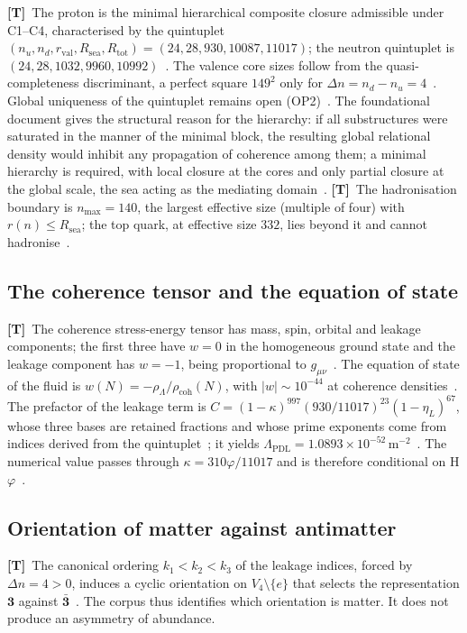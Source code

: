 \documentclass[11pt,a4paper]{article}
\theoremstyle{plain}
\theoremstyle{definition}
\theoremstyle{remark}
\newcommand{\statT}{\textbf{[T]}}
\begin{document}
\statT\ The proton is the minimal hierarchical composite closure admissible under C1--C4, characterised by the quintuplet $(n_u,n_d,r_{\mathrm{val}},R_{\mathrm{sea}},R_{\mathrm{tot}})=(24,28,930,10087,11017)$; the neutron quintuplet is $(24,28,1032,9960,10992)$~\citep{D16a,D47v2,DMv34}. The valence core sizes follow from the quasi-completeness discriminant, a perfect square $149^2$ only for $\Delta n=n_d-n_u=4$~\citep{D47v2}. Global uniqueness of the quintuplet remains open (OP2)~\citep{DMv34}. The foundational document gives the structural reason for the hierarchy: if all substructures were saturated in the manner of the minimal block, the resulting global relational density would inhibit any propagation of coherence among them; a minimal hierarchy is required, with local closure at the cores and only partial closure at the global scale, the sea acting as the mediating domain~\citep{D01}. \statT\ The hadronisation boundary is $n_{\max}=140$, the largest effective size (multiple of four) with $r(n)\le R_{\mathrm{sea}}$; the top quark, at effective size $332$, lies beyond it and cannot hadronise~\citep{D63}.

\subsection{The coherence tensor and the equation of state}

\statT\ The coherence stress-energy tensor has mass, spin, orbital and leakage components; the first three have $w=0$ in the homogeneous ground state and the leakage component has $w=-1$, being proportional to $g_{\mu\nu}$~\citep{D48,D54,D67}. The equation of state of the fluid is $w(N)=-\rho_\Lambda/\rho_{\mathrm{coh}}(N)$, with $|w|\sim10^{-44}$ at coherence densities~\citep{D54}. The prefactor of the leakage term is $C=(1-\kappa)^{997}(930/11017)^{23}(1-\eta_L)^{67}$, whose three bases are retained fractions and whose prime exponents come from indices derived from the quintuplet~\citep{D51,D52}; it yields $\Lambda_{\mathrm{PDL}}=1.0893\times10^{-52}\,\mathrm{m}^{-2}$~\citep{D51,D53}. The numerical value passes through $\kappa=310\varphi/11017$ and is therefore conditional on H$\varphi$~\citep{D05v2,DMv34}.

\subsection{Orientation of matter against antimatter}

\statT\ The canonical ordering $k_1<k_2<k_3$ of the leakage indices, forced by $\Delta n=4>0$, induces a cyclic orientation on $V_4\setminus\{e\}$ that selects the representation $\mathbf{3}$ against $\bar{\mathbf{3}}$~\citep{D59}. The corpus thus identifies which orientation is matter. It does not produce an asymmetry of abundance.
\end{document}
